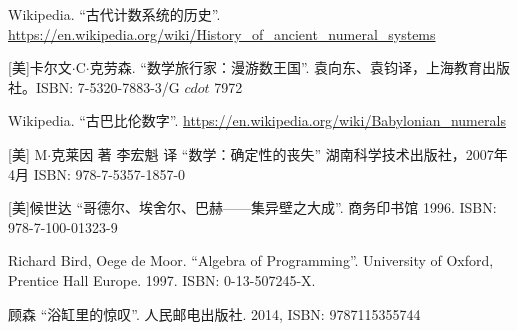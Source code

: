 \documentclass[UTF8]{article}
\begin{document}
\ifx\wholebook\relax \else
\begin{thebibliography}{99}

Wikipedia. ``古代计数系统的历史''. \url{https://en.wikipedia.org/wiki/History_of_ancient_numeral_systems}

[美]卡尔文$\cdot$C$\cdot$克劳森. ``数学旅行家：漫游数王国''. 袁向东、袁钧译，上海教育出版社。ISBN: 7-5320-7883-3/G $cdot$ 7972

Wikipedia. ``古巴比伦数字''. \url{https://en.wikipedia.org/wiki/Babylonian_numerals}

[美] M$\cdot$克莱因 著 李宏魁 译 ``数学：确定性的丧失'' 湖南科学技术出版社，2007年4月 ISBN: 978-7-5357-1857-0

[美]候世达 ``哥德尔、埃舍尔、巴赫——集异壁之大成''. 商务印书馆 1996. ISBN: 978-7-100-01323-9

Richard Bird, Oege de Moor. ``Algebra of Programming''. University of Oxford, Prentice Hall Europe. 1997. ISBN: 0-13-507245-X.

顾森 ``浴缸里的惊叹''. 人民邮电出版社. 2014, ISBN: 9787115355744

\end{thebibliography}

\expandafter\enddocument

\fi
\end{document}
